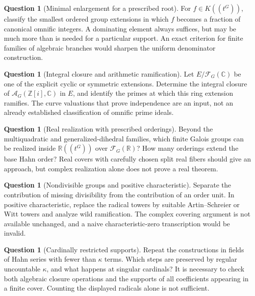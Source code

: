 \documentclass[11pt,letterpaper]{article}
\theoremstyle{definition}
\newtheorem{question}[theorem]{Question}
\theoremstyle{remark}
\newcommand{\R}{\mathbb R}
\newcommand{\C}{\mathbb C}
\newcommand{\Z}{\mathbb Z}
\newcommand{\HH}[2]{#1((t^{#2}))}
\newcommand{\FF}[2]{\mathcal F_{#2}(#1)}
\newcommand{\AAG}[3]{\mathcal A_{#3}(#1,#2)}
\begin{document}
\begin{question}[Minimal enlargement for a prescribed root]\label{bst:gr:q:minimal}
For $f\in\HH KG$, classify the smallest ordered group extensions in which $f$
becomes a fraction of canonical omnific integers. A dominating element always
suffices, but may be much more than is needed for a particular support. An
exact criterion for finite families of algebraic branches would sharpen the
uniform denominator construction.
\end{question}

\begin{question}[Integral closure and arithmetic ramification]\label{bst:gr:q:integral}
Let $E/\FF{\C}G$ be one of the explicit cyclic or symmetric extensions.
Determine the integral closure of $\AAG{\Z[i]}{\C}G$ in $E$, and identify the
primes at which this ring extension ramifies. The curve valuations that prove
independence are an input, not an already established classification of
omnific prime ideals.
\end{question}

\begin{question}[Real realization with prescribed orderings]\label{bst:gr:q:real}
Beyond the multiquadratic and generalized-dihedral families, which finite
Galois groups can be realized inside $\HH{\R}G$ over $\FF{\R}G$? How many
orderings extend the base Hahn order? Real covers with carefully chosen split
real fibers should give an approach, but complex realization alone does not
prove a real theorem.
\end{question}

\begin{question}[Nondivisible groups and positive characteristic]\label{bst:gr:q:charp}
Separate the contribution of missing divisibility from the contribution of an
order unit. In positive characteristic, replace the radical towers by suitable
Artin--Schreier or Witt towers and analyze wild ramification. The complex
covering argument is not available unchanged, and a naive
characteristic-zero transcription would be invalid.
\end{question}

\begin{question}[Cardinally restricted supports]\label{bst:gr:q:cardinal}
Repeat the constructions in fields of Hahn series with fewer than $\kappa$
terms. Which steps are preserved by regular uncountable $\kappa$, and what
happens at singular cardinals? It is necessary to check both algebraic
closure operations and the supports of all coefficients appearing in a finite
cover. Counting the displayed radicals alone is not sufficient.
\end{question}
\end{document}
